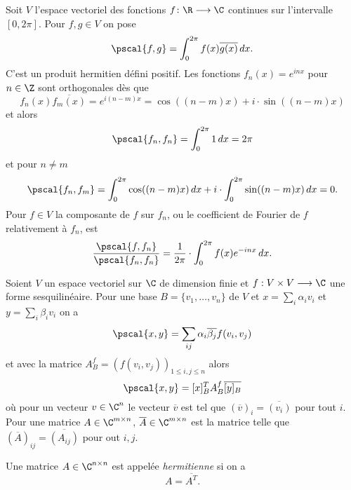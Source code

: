\begin{example}
  \label{exe:13}
  Soit $V$ l'espace vectoriel des fonctions $f\colon \R \longrightarrow \C$   continues sur l'intervalle $[0, 2\pi]$. Pour $f,g \in V$ on pose
  \begin{displaymath}
    \pscal{f,g} = \int_0^{2\pi} f(x) \overline{g(x)} \, dx.
  \end{displaymath}
C'est un produit hermitien défini positif. Les fonctions $f_n (x)=  e^{inx}$ pour $n \in \Z$ sont orthogonales dès que 
\begin{displaymath}
  f_n(x) \overline{f_m(x)} = e^{i(n-m)x} = \cos((n-m) x) + i \cdot \sin((n-m) x)
\end{displaymath}
et alors 
\begin{displaymath}
  \pscal{f_n,f_n} = \int_0^{2 \pi} 1 \, dx = 2 \pi 
\end{displaymath}
et pour $n \neq m$ 
\begin{displaymath}
  \pscal{f_n,f_m} = \int_0^{2 \pi} \cos( (n-m) x) \, dx  + i \cdot \int_0^{2 \pi} \sin( (n-m) x) \, dx = 0.
\end{displaymath}
Pour $f \in V$ la composante de $f$ sur $f_n$, ou le coefficient de Fourier de $f$ relativement à $f_n$, est 
\begin{displaymath}
  \frac{\pscal{f,f_n}}{\pscal{f_n,f_n}} = \frac{1}{2\pi} \cdot \int_0^{2\pi} f(x) e^{-inx} \, dx. 
\end{displaymath}
\end{example}





Soient $V$ un espace vectoriel sur $\C$ de dimension finie et $f: V \times V \longrightarrow \C$ une forme sesquilinéaire. Pour une base  $B = \{v_1,\dots,v_n\}$ de $V$ et $x = \sum_i \alpha_i v_i$ et $y = \sum_i \beta_i v_i$ on a 
\begin{displaymath}
  \pscal{x,y} = \sum_{ij} \alpha_i\overline{\beta_j} f(v_i,v_j)
\end{displaymath}
et avec la matrice $A_B^f = (f(v_i,v_j))_{1 \leq i,j \leq n}$   alors 
\begin{equation}
  \label{eq:9}
  \pscal{x,y} = [x]_B ^T A_B^{f} \overline{[y]_B} 
\end{equation}
où pour un vecteur $v \in \C^n$ le vecteur $\overline{v}$ est tel que $(\overline{v})_i = \overline{(v_i)}$ pour tout $i$. Pour une matrice $A \in \C^{m \times n}$, $\overline{A} \in \C^{m \times n}$ est la matrice telle que 
$\left(\overline{A}\right)_{ij} = \overline{(A_{ij})}$ pour out $i,j$. 
\begin{definition}
  \label{def:17}
  Une matrice $A \in \C^{n \times n}$ est appelée \emph{hermitienne} si on a 
  \begin{displaymath}
    A = \overline{A^T}. 
  \end{displaymath}
\end{definition}



